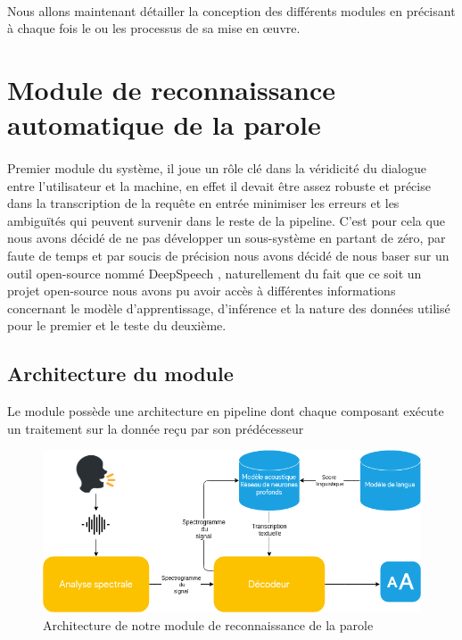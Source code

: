 	\paragraph{}
	Nous allons maintenant détailler la conception des différents modules en précisant à chaque fois le ou les processus de sa mise en œuvre. 
\section{Module de reconnaissance automatique de la parole}
\paragraph{}
Premier module du système, il joue un rôle clé dans la véridicité du dialogue entre l'utilisateur et la machine, en effet il devait être assez robuste et précise dans la transcription de la requête en entrée minimiser les erreurs et les ambiguïtés qui peuvent survenir dans le reste de la pipeline. C'est pour cela que nous avons décidé de ne pas développer un sous-système en partant de zéro, par faute de temps et par soucis de précision nous avons décidé de nous baser sur un outil open-source nommé DeepSpeech \cite{deepspeech_paper}, naturellement du fait que ce soit un projet open-source nous avons pu avoir accès à différentes informations concernant le modèle d'apprentissage, d'inférence et la nature des données utilisé pour le premier et le teste du deuxième.
	\subsection{Architecture du module}
	Le module possède une architecture en pipeline dont chaque composant exécute un traitement sur la donnée reçu par son prédécesseur
	\begin{figure}[H] 
		\label{deep_speech_arch}
		\centering
		\includegraphics[width=0.88\linewidth]{images/Conception/ASR/schema.png}
		\caption{Architecture de notre module de reconnaissance de la parole}
	\end{figure}
